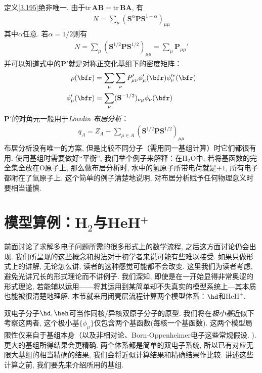 定义\autoref{3.195}绝非唯一. 
由于$\mathrm{tr}\,\mathbf{AB}=\mathrm{tr}\,\mathbf{BA}$, 
有
\begin{align}
	N = \sum_\mu (\mathbf{S}^\alpha\mathbf{PS}^{1-\alpha})_{\mu\mu}
\end{align}
其中$\alpha$任意. 
若$\alpha=1/2$则有
\begin{align}
	\label{3.198}
	N = \sum_\mu (\mathbf{S}^{1/2}\mathbf{PS}^{1/2})_{\mu\mu} = \sum_\mu \mathbf{P}_{\mu\mu}'
\end{align}
并可以知道式中的$\mathbf{P}'$就是对称正交化基组下的密度矩阵：
\begin{align}
	\rho(\bfr) &= \sum_\mu\sum_\nu P'_{\mu\nu}\phi_\mu'(\bfr)\phi_\nu^{\prime *}(\bfr)\\
	\phi'_{\mu}(\bfr) &= \sum_\nu(\mathbf{S}^{-1/2})_{\nu\mu}\phi_\nu(\bfr)
\end{align}
$\mathbf{P}'$的对角元一般用于\emph{L\"owdin 布居分析}：
\begin{align}
	q_A = Z_A - \sum_{\mu\in A}(\mathbf{S}^{1/2}\mathbf{PS}^{1/2})_{\mu\mu}
\end{align}
布居分析没有唯一的方案, 
但是比较不同分子（需用同一基组计算）时它们都很有用. 
使用基组时需要做好``平衡'', 
我们举个例子来解释：在$\mathrm{H}_2\mathrm{O}$中, 
若将基函数的完全集全放在$\mathrm{O}$原子上, 
那么做布居分析时, 
水中的氢原子所带电荷就是$+1$, 
所有电子都附在了氧原子上. 
这个简单的例子清楚地说明,
对布居分析赋予任何物理意义时要相当谨慎.

\section{模型算例：H$_2$与HeH$^+$}
\label{sec:3.5}
前面讨论了求解多电子问题所需的很多形式上的数学流程, 
之后这方面讨论仍会出现. 
我们所呈现的这些概念和想法对于初学者来说可能有些难以接受. 如果只做形式上的讲解, 无论怎么讲, 读者的这种感觉可能都不会改变. 
这里我们为读者考虑, 避免光讲冗长的形式理论而不讲例子.  
我们深知, 即使是在一开始显得非常奥涩的形式理论, 
若能辅以运用——将其运用到某简单却不失真实的模型系统上---其本质也能被很清楚地理解. 
本节就来用闭壳层\hft 流程计算两个模型体系：$\hd$和$\mathrm{HeH}^+$.


双电子分子$\hd,\heh$可当作同核/异核双原子分子的原型. 
我们将在\emph{极小基}近似下考察这两者, 
这个极小基$\{\phi_\mu\}$仅包含两个基函数(每核一个基函数). 
这两个模型局限性仅来自于基组本身（以及非相对论、Born-Oppenheimer电子\ha 这些常规假设.
). 
更大的基组所得结果会更精确. 
两个体系都是简单的双电子系统, 
所以已有对应无限大基组的相当精确的结果, 
我们会将近似计算结果和精确结果作比较. 
讲述这些计算之前, 
我们要先来介绍所用的基组.

